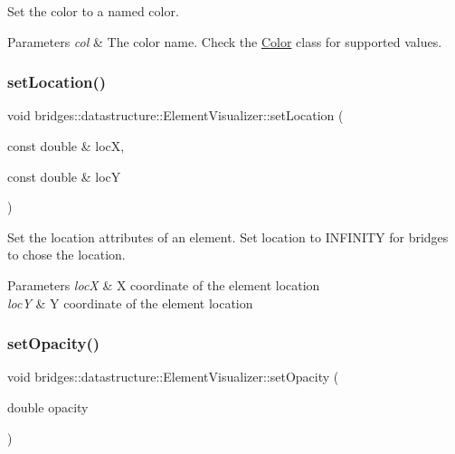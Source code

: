 Set the color to a named color. 


\begin{DoxyParams}{Parameters}
{\em col} & The color name. Check the \mbox{\hyperlink{classbridges_1_1datastructure_1_1_color}{Color}} class for supported values. \\
\hline
\end{DoxyParams}
\mbox{\label{classbridges_1_1datastructure_1_1_element_visualizer_ae980cb185ddb11ecd1cebeb4834734bf}} 
\subsubsection{\texorpdfstring{set\+Location()}{setLocation()}}
{\footnotesize\ttfamily void bridges\+::datastructure\+::\+Element\+Visualizer\+::set\+Location (\begin{DoxyParamCaption}\item[{const double \&}]{locX,  }\item[{const double \&}]{locY }\end{DoxyParamCaption})\hspace{0.3cm}{\ttfamily [inline]}}

Set the location attributes of an element. Set location to I\+N\+F\+I\+N\+I\+TY for bridges to chose the location.


\begin{DoxyParams}{Parameters}
{\em locX} & X coordinate of the element location \\
\hline
{\em locY} & Y coordinate of the element location \\
\hline
\end{DoxyParams}
\mbox{\label{classbridges_1_1datastructure_1_1_element_visualizer_a03f0ba203affb77d4ba8d2f1a6b1eea0}} 
\subsubsection{\texorpdfstring{set\+Opacity()}{setOpacity()}}
{\footnotesize\ttfamily void bridges\+::datastructure\+::\+Element\+Visualizer\+::set\+Opacity (\begin{DoxyParamCaption}\item[{double}]{opacity }\end{DoxyParamCaption})\hspace{0.3cm}{\ttfamily [inline]}}


